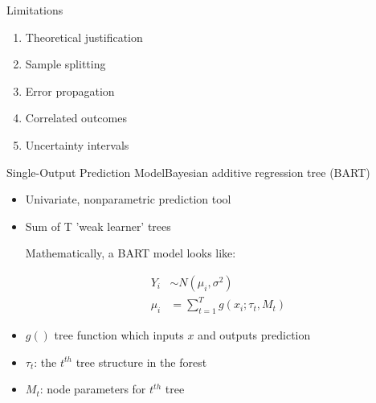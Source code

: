 \documentclass{beamer}
\begin{document}
\begin{frame}{Limitations}
\begin{enumerate}
\item Theoretical justification
\item Sample splitting
\item Error propagation
\item Correlated outcomes
\item Uncertainty intervals
\end{enumerate}
\end{frame}


\begin{frame}{Single-Output Prediction Model}{Bayesian additive regression tree (BART)}
\begin{itemize}
\item Univariate, nonparametric prediction tool
\item Sum of T 'weak learner' trees %


Mathematically, a BART model looks like:

\begin{align*}
Y_i &\sim N(\mu_i, \sigma^2)\\
\mu_i &= \sum_{t=1}^T g(x_i ; \tau_t, M_t)%
\end{align*}


\item $g()$ tree function which inputs $x$ and outputs prediction
\item $\tau_t$: the $t^{th}$ tree structure in the forest 
\item $M_t$: node parameters for $t^{th}$ tree
\end{itemize}


\end{frame}
\end{document}
